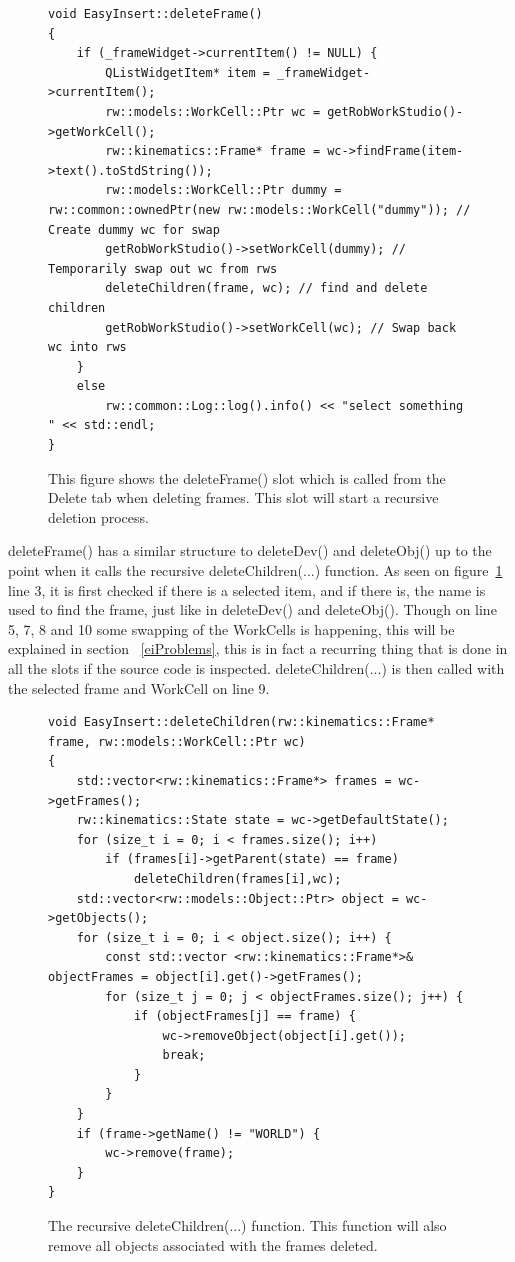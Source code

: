 \begin{figure}[h] %
\centering
\lstset{language=C++} 
\begin{lstlisting}[frame=single]  
void EasyInsert::deleteFrame()
{
    if (_frameWidget->currentItem() != NULL) {
        QListWidgetItem* item = _frameWidget->currentItem();
        rw::models::WorkCell::Ptr wc = getRobWorkStudio()->getWorkCell();
        rw::kinematics::Frame* frame = wc->findFrame(item->text().toStdString());
        rw::models::WorkCell::Ptr dummy = rw::common::ownedPtr(new rw::models::WorkCell("dummy")); // Create dummy wc for swap
        getRobWorkStudio()->setWorkCell(dummy); // Temporarily swap out wc from rws
        deleteChildren(frame, wc); // find and delete children
        getRobWorkStudio()->setWorkCell(wc); // Swap back wc into rws
    }
    else
        rw::common::Log::log().info() << "select something " << std::endl;
}
\end{lstlisting}
\caption{This figure shows the deleteFrame() slot which is called from the Delete tab when deleting frames. This slot will start a recursive deletion process.}
\label{fig:eiDeleteFrames} 	
\end{figure}

deleteFrame() has a similar structure to deleteDev() and deleteObj() up to the point when it calls the recursive deleteChildren(...) function. As seen on figure~\ref{fig:eiDeleteFrames} line 3, it is first checked if there is a selected item, and if there is, the name is used to find the frame, just like in deleteDev() and deleteObj(). Though on line 5, 7, 8 and 10 some swapping of the WorkCells is happening, this will be explained in section ~\ref{eiProblems}, this is in fact a recurring thing that is done in all the slots if the source code is inspected. 
deleteChildren(...) is then called with the selected frame and WorkCell on line 9.

\begin{figure}[h] %
\centering
\lstset{language=C++} 
\begin{lstlisting}[frame=single]  
void EasyInsert::deleteChildren(rw::kinematics::Frame* frame, rw::models::WorkCell::Ptr wc)
{
    std::vector<rw::kinematics::Frame*> frames = wc->getFrames();
    rw::kinematics::State state = wc->getDefaultState();
    for (size_t i = 0; i < frames.size(); i++)
        if (frames[i]->getParent(state) == frame)
            deleteChildren(frames[i],wc);
    std::vector<rw::models::Object::Ptr> object = wc->getObjects();
    for (size_t i = 0; i < object.size(); i++) {
        const std::vector <rw::kinematics::Frame*>& objectFrames = object[i].get()->getFrames();
        for (size_t j = 0; j < objectFrames.size(); j++) {
            if (objectFrames[j] == frame) {
                wc->removeObject(object[i].get());
                break;
            }
        }
    }
    if (frame->getName() != "WORLD") {
        wc->remove(frame);
    }
}
\end{lstlisting}
\caption{The recursive deleteChildren(...) function. This function will also remove all objects associated with the frames deleted.}
\label{fig:eiDeleteChildren} 	
\end{figure}

